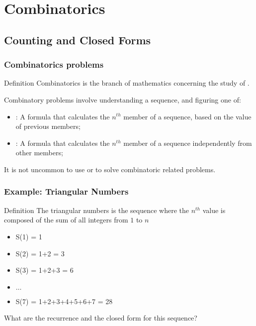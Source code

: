 \documentclass{beamer}
\begin{document}
\section{Combinatorics}
\subsection{Counting and Closed Forms}
\begin{frame}
  \frametitle{Combinatorics problems} 

  {\smaller
    \begin{block}{Definition}
      Combinatorics is the branch of mathematics concerning the study of
      .
    \end{block}

    Combinatory problems involve understanding a sequence, and
    figuring one of:

    \medskip 

    \begin{itemize}
    \item {}: A formula that calculates the
      $n^{th}$ member of a sequence, based on the value of previous members;
      
    \item {}: A formula that calculates the
      $n^{th}$ member of a sequence independently from other members;
    \end{itemize}

  \bigskip

  It is not uncommon to use  or
   to solve combinatoric related problems.
  }
\end{frame}

\begin{frame}
  \frametitle{Example: Triangular Numbers}
  {\smaller
  \begin{block}{Definition}
    The triangular numbers is the sequence where the $n^{th}$ value is
    composed of the sum of all integers from $1$ to $n$
  \end{block}

  \begin{itemize}
  \item S(1) = 1
  \item S(2) = 1+2 = 3
  \item S(3) = 1+2+3 = 6
  \item $\ldots$
  \item S(7) = 1+2+3+4+5+6+7 = 28
  \end{itemize}
  }

  What are the recurrence and the closed form for this sequence?
\end{frame}
\end{document}
